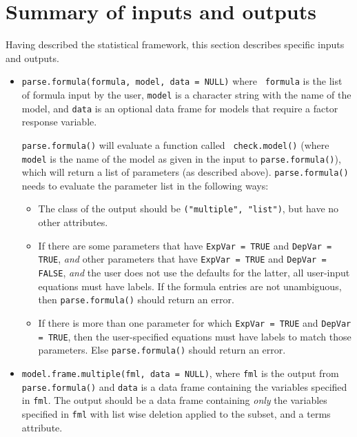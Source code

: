 \documentclass[oneside,letterpaper,12pt]{article}
\begin{document}
\section{Summary of inputs and outputs}

Having described the statistical framework, this section describes
specific inputs and outputs.  

\begin{itemize}

\item {\tt parse.formula(formula, model, data = NULL)} where {\tt
formula} is the list of formula input by the user, {\tt model} is a
character string with the name of the model, and {\tt data} is an
optional data frame for models that require a factor response
variable.  

{\tt parse.formula()} will evaluate a function called {\tt
check.model()} (where {\tt model} is the name of the model as given in
the input to {\tt parse.formula()}), which will return a list of
parameters (as described above).  {\tt parse.formula()} needs to
evaluate the parameter list in the following ways:  
\begin{itemize}
\item The class of the output should be {\tt ("multiple", "list")},
but have no other attributes.    

\item If there are some parameters that have {\tt ExpVar = TRUE} and
{\tt DepVar = TRUE}, \emph{and} other parameters that have {\tt ExpVar
= TRUE} and {\tt DepVar = FALSE}, \emph{and} the user does not use the
defaults for the latter, all user-input equations must have labels.
If the formula entries are not unambiguous, then {\tt parse.formula()}
should return an error.  

\item If there is more than one parameter for which {\tt ExpVar =
TRUE} and {\tt DepVar = TRUE}, then the user-specified equations must
have labels to match those parameters.  Else {\tt parse.formula()}
should return an error.  
\end{itemize}

\item {\tt model.frame.multiple(fml, data = NULL)}, where {\tt fml}
is the output from {\tt parse.formula()} and {\tt data} is a data
frame containing the variables specified in {\tt fml}.  The output
should be a data frame containing \emph{only} the variables specified
in {\tt fml} with list wise deletion applied to the subset, and a terms
attribute.  


\end{itemize}
\end{document}
